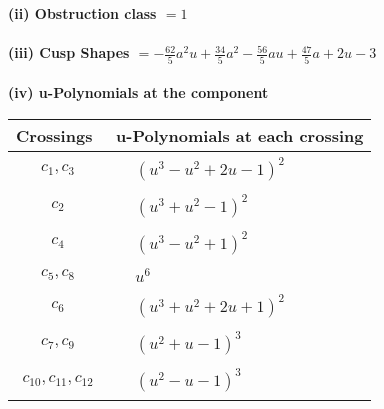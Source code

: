 \documentclass[1p]{elsarticle_modified}
\theoremstyle{definition}
\begin{document}
\flushleft \textbf{(ii) Obstruction class $= 1$}\\~\\
\flushleft \textbf{(iii) Cusp Shapes $= -\frac{62}{5} a^2 u+\frac{34}{5} a^2-\frac{56}{5} a u+\frac{47}{5} a+2 u-3$}\\~\\
\newpage\renewcommand{\arraystretch}{1}
\flushleft \textbf{(iv) u-Polynomials at the component}\newline \\
\begin{tabular}{m{50pt}|m{274pt}}
Crossings & \hspace{64pt}u-Polynomials at each crossing \\
\hline $$\begin{aligned}c_{1},c_{3}\end{aligned}$$&$\begin{aligned}
&(u^3- u^2+2 u-1)^2
\end{aligned}$\\
\hline $$\begin{aligned}c_{2}\end{aligned}$$&$\begin{aligned}
&(u^3+u^2-1)^2
\end{aligned}$\\
\hline $$\begin{aligned}c_{4}\end{aligned}$$&$\begin{aligned}
&(u^3- u^2+1)^2
\end{aligned}$\\
\hline $$\begin{aligned}c_{5},c_{8}\end{aligned}$$&$\begin{aligned}
&u^6
\end{aligned}$\\
\hline $$\begin{aligned}c_{6}\end{aligned}$$&$\begin{aligned}
&(u^3+u^2+2 u+1)^2
\end{aligned}$\\
\hline $$\begin{aligned}c_{7},c_{9}\end{aligned}$$&$\begin{aligned}
&(u^2+u-1)^3
\end{aligned}$\\
\hline $$\begin{aligned}c_{10},c_{11},c_{12}\end{aligned}$$&$\begin{aligned}
&(u^2- u-1)^3
\end{aligned}$\\
\hline
\end{tabular}\\~\\
\end{document}
